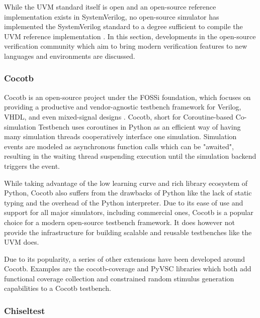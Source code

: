 While the UVM standard itself is open and an open-source reference implementation exists in SystemVerilog, no
open-source simulator has implemented the SystemVerilog standard to a degree sufficient to compile the UVM reference
implementation \cite{Sasselli2023}. In this section, developments in the open-source verification community which aim
to bring modern verification features to new languages and environments are discussed.

\subsubsection{Cocotb} %

Cocotb is an open-source project under the FOSSi foundation, which focuses on providing a productive and
vendor-agnostic testbench framework for Verilog, VHDL, and even mixed-signal designs \cite{cocotb}. Cocotb, short for
Coroutine-based Co-simulation Testbench uses coroutines in Python as an efficient way of having many simulation
threads cooperatively interface one simulation. Simulation events are modeled as asynchronous function calls which
can be "awaited", resulting in the waiting thread suspending execution until the simulation backend triggers the event.

While taking advantage of the low learning curve and rich library ecosystem of Python, Cocotb also suffers from the
drawbacks of Python like the lack of static typing and the overhead of the Python interpreter. Due to its ease of use
and support for all major simulators, including commercial ones, Cocotb is a popular choice for a modern open-source
testbench framework. It does however not provide the infrastructure for building scalable and reusable testbenches
like the UVM does.

Due to its popularity, a series of other extensions have been developed around Cocotb. Examples are the
cocotb-coverage \cite{crvpython} and PyVSC \cite{pyvsc} libraries which both add functional coverage collection and
constrained random stimulus generation capabilities to a Cocotb testbench.

\subsubsection{Chiseltest} %

